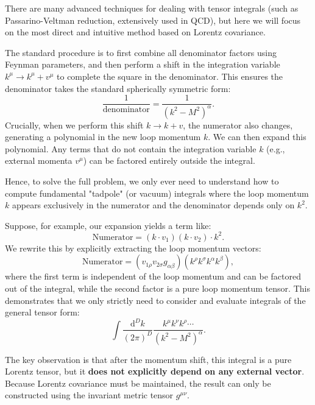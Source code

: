 
There are many advanced techniques for dealing with tensor integrals (such as Passarino-Veltman reduction, extensively used in QCD), but here we will focus on the most direct and intuitive method based on Lorentz covariance.

The standard procedure is to first combine all denominator factors using Feynman parameters, and then perform a shift in the integration variable $k^\mu \to k^\mu + v^\mu$ to complete the square in the denominator. This ensures the denominator takes the standard spherically symmetric form:
\[
    \frac{1}{\text{denominator}} = \frac{1}{(k^2 - M^2)^\alpha}.
\]
Crucially, when we perform this shift $k \to k+v$, the numerator also changes, generating a polynomial in the new loop momentum $k$. We can then expand this polynomial. Any terms that do not contain the integration variable $k$ (e.g., external momenta $v^\mu$) can be factored entirely outside the integral.

Hence, to solve the full problem, we only ever need to understand how to compute fundamental "tadpole" (or vacuum) integrals where the loop momentum $k$ appears exclusively in the numerator and the denominator depends only on $k^2$.

Suppose, for example, our expansion yields a term like:
\[
    \text{Numerator} = (k \cdot v_1)(k \cdot v_2) \cdot k^2.
\]
We rewrite this by explicitly extracting the loop momentum vectors:
\[
    \text{Numerator} = \left( v_{1\rho} v_{2\sigma} g_{\alpha\beta}\right) \left( k^\rho k^\sigma k^\alpha k^\beta \right),
\]
where the first term is independent of the loop momentum and can be factored out of the integral, while the second factor is a pure loop momentum tensor.
This demonstrates that we only strictly need to consider and evaluate integrals of the general tensor form:
\[
    \int \frac{\mathrm{d}^D k}{(2\pi)^D} \frac{k^\mu k^\nu k^\rho \cdots}{(k^2 - M^2)^\alpha}.
\]

The key observation is that after the momentum shift, this integral is a pure Lorentz tensor, but it \textbf{does not explicitly depend on any external vector}. Because Lorentz covariance must be maintained, the result can only be constructed using the invariant metric tensor $g^{\mu\nu}$.

